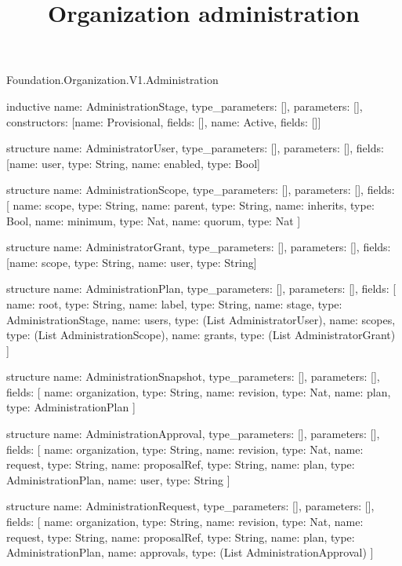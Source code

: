 \begin{lexlean}{Foundation.Organization.V1.Administration}
\title{Organization administration}
\begin{semanticmodule}
inductive{
  name: AdministrationStage,
  type_parameters: [],
  parameters: [],
  constructors: [{name: Provisional, fields: []}, {name: Active, fields: []}]
}

structure{
  name: AdministratorUser,
  type_parameters: [],
  parameters: [],
  fields: [{name: user, type: String}, {name: enabled, type: Bool}]
}

structure{
  name: AdministrationScope,
  type_parameters: [],
  parameters: [],
  fields: [
    {name: scope, type: String},
    {name: parent, type: String},
    {name: inherits, type: Bool},
    {name: minimum, type: Nat},
    {name: quorum, type: Nat}
  ]
}

structure{
  name: AdministratorGrant,
  type_parameters: [],
  parameters: [],
  fields: [{name: scope, type: String}, {name: user, type: String}]
}

structure{
  name: AdministrationPlan,
  type_parameters: [],
  parameters: [],
  fields: [
    {name: root, type: String},
    {name: label, type: String},
    {name: stage, type: AdministrationStage},
    {name: users, type: (List AdministratorUser)},
    {name: scopes, type: (List AdministrationScope)},
    {name: grants, type: (List AdministratorGrant)}
  ]
}

structure{
  name: AdministrationSnapshot,
  type_parameters: [],
  parameters: [],
  fields: [
    {name: organization, type: String},
    {name: revision, type: Nat},
    {name: plan, type: AdministrationPlan}
  ]
}

structure{
  name: AdministrationApproval,
  type_parameters: [],
  parameters: [],
  fields: [
    {name: organization, type: String},
    {name: revision, type: Nat},
    {name: request, type: String},
    {name: proposalRef, type: String},
    {name: plan, type: AdministrationPlan},
    {name: user, type: String}
  ]
}

structure{
  name: AdministrationRequest,
  type_parameters: [],
  parameters: [],
  fields: [
    {name: organization, type: String},
    {name: revision, type: Nat},
    {name: request, type: String},
    {name: proposalRef, type: String},
    {name: plan, type: AdministrationPlan},
    {name: approvals, type: (List AdministrationApproval)}
  ]
}


\end{semanticmodule}
\end{lexlean}
